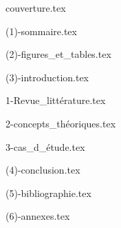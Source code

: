 \documentclass[12pt, letterpaper, table, xcdraw]{model}
\begin{document}
  {couverture.tex}
  \clearpage

  {(1)-sommaire.tex}
  \clearpage

  {(2)-figures_et_tables.tex}
  \clearpage
  
  {(3)-introduction.tex}
  \clearpage

  {1-Revue_littérature.tex}
  \clearpage

  {2-concepts_théoriques.tex}
  \clearpage

  {3-cas_d_étude.tex}
  \clearpage

  {(4)-conclusion.tex}
  \clearpage
  
  {(5)-bibliographie.tex}
  \clearpage
  
  {(6)-annexes.tex}
  \clearpage
\end{document}
